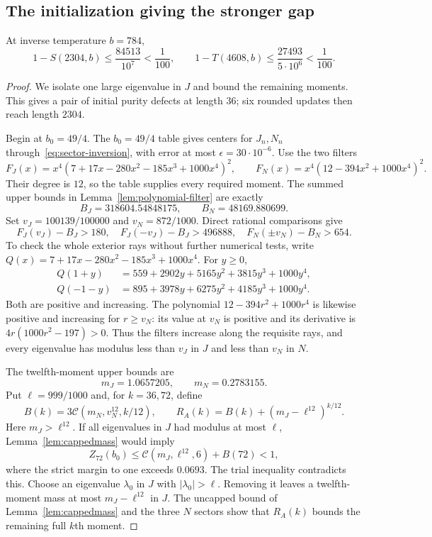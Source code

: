\subsection{The initialization giving the stronger gap}

\begin{proposition}\label{prop:seed2304}
At inverse temperature $b=784$,
\[
 1-S(2304,b)\le\frac{84513}{10^7}<\frac1{100},\qquad
 1-T(4608,b)\le\frac{27493}{5\cdot10^6}<\frac1{100}.
\]
\end{proposition}

\begin{proof}
We isolate one large eigenvalue in $J$ and bound the remaining moments.
This gives a pair of initial purity defects at length $36$; six rounded
updates then reach length $2304$.

Begin at $b_0=49/4$.  The $b_0=49/4$ table gives centers for $J_n,N_n$
through~\eqref{eq:sector-inversion}, with error at most
$\epsilon=30\cdot10^{-6}$.  Use the two filters
\[
 F_J(x)=x^4(7+17x-280x^2-185x^3+1000x^4)^2,
 \qquad F_N(x)=x^4(12-394x^2+1000x^4)^2.
\]
Their degree is $12$, so the table supplies every required moment.  The
summed upper bounds in Lemma~\ref{lem:polynomial-filter} are exactly
\[
 B_J=318604.54848175,\qquad B_N=48169.880699.
\]
Set $v_J=100139/100000$ and $v_N=872/1000$.  Direct rational comparisons give
\[
 F_J(v_J)-B_J>180,\quad F_J(-v_J)-B_J>496888,\quad
 F_N(\pm v_N)-B_N>654.
\]
To check the whole exterior rays without further numerical tests, write
$Q(x)=7+17x-280x^2-185x^3+1000x^4$.  For $y\ge0$,
\[
\begin{aligned}
 Q(1+y)&=559+2902y+5165y^2+3815y^3+1000y^4,\\
 Q(-1-y)&=895+3978y+6275y^2+4185y^3+1000y^4.
\end{aligned}
\]
Both are positive and increasing.  The polynomial
$12-394r^2+1000r^4$ is likewise positive and increasing for $r\ge v_N$:
its value at $v_N$ is positive and its derivative is
$4r(1000r^2-197)>0$.  Thus the filters increase along the requisite rays,
and every eigenvalue has modulus less than $v_J$ in $J$ and less than
$v_N$ in $N$.

The twelfth-moment upper bounds are
\[
 m_J=1.0657205,\qquad m_N=0.2783155.
\]
Put $\ell=999/1000$ and, for $k=36,72$, define
\begin{equation}\label{eq:seed72-tail}
 B(k)=3\mathcal C(m_N,v_N^{12},k/12),\qquad
 R_A(k)=B(k)+(m_J-\ell^{12})^{k/12}.
\end{equation}
Here $m_J>\ell^{12}$.  If all eigenvalues in $J$ had modulus at most $\ell$,
Lemma~\ref{lem:cappedmass} would imply
\[
 Z_{72}(b_0)\le\mathcal C(m_J,\ell^{12},6)+B(72)<1,
\]
where the strict margin to one exceeds $0.0693$.  The trial inequality
contradicts this.  Choose an eigenvalue $\lambda_0$ in $J$ with
$|\lambda_0|>\ell$.  Removing it leaves a twelfth-moment mass at most
$m_J-\ell^{12}$ in $J$.  The uncapped bound of Lemma~\ref{lem:cappedmass}
and the three $N$ sectors show that $R_A(k)$ bounds the remaining full
$k$th moment.


\end{proof}
